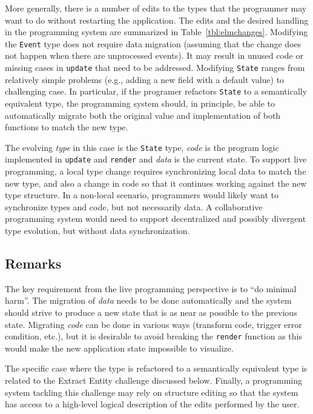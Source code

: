 \documentclass[english,submission]{programming}
\DeclareRobustCommand{\frameworkbox}[2][gray!15]{
\begin{tcolorbox}[breakable,left=3pt,right=3pt,top=3pt,bottom=3pt,colback=#1,colframe=#1,parbox=false,
  width=\dimexpr\textwidth\relax,enlarge left by=0mm,boxsep=5pt,arc=0pt,enlarge top by=0.5em,%
  outer arc=0pt]\setlength{\parskip}{0.5em}\setlength{\parindent}{0em}{\firamedium Framework perspective.}\quad #2
\end{tcolorbox}}
\begin{document}
More generally, there is a number of edits to the types that the programmer may want to do
without restarting the application. The edits and the desired handling in the programming
system are summarized in Table~\ref{tbl:elmchanges}. Modifying the \texttt{Event} type does not
require data migration (assuming that the change does not happen when there are unprocessed
events). It may result in unused code or missing cases in \texttt{update} that need to be addressed.
Modifying \texttt{State} ranges from relatively simple problems (e.g., adding a new field with a
default value) to challenging case. In particular, if the programer refactors \texttt{State} to a
semantically equivalent type, the programming system should, in principle, be able to automatically
migrate both the original value and implementation of both functions to match the new type.

\frameworkbox{
The evolving \emph{type} in this case is the \texttt{State} type, \emph{code} is the
program logic implemented in \texttt{update} and \texttt{render} and \emph{data} is the current
state. To support live programming, a local type change requires synchronizing local data to
match the new type, and also a change in code so that it continues working against the new type
structure. In a non-local scenario, programmers would likely want to synchronize types and code,
but not necessarily data. A collaborative programming system would need to support decentralized
and possibly divergent type evolution, but without data synchronization.
}

\subsection{Remarks}
The key requirement from the live programming perspective is to ``do minimal harm''.
The migration of \emph{data} needs to be done automatically and the system should strive
to produce a new state that is as near as possible to the previous state. Migrating
\emph{code} can be done in various ways (transform code, trigger error condition, etc.),
but it is desirable to avoid breaking the \texttt{render} function as this would make the
new application state impossible to visualize.

The specific case where the type is refactored to a semantically equivalent type is related to
the Extract Entity challenge discussed below. Finally, a programming system tackling this
challenge may rely on structure editing so that the system has access to a high-level logical
description of the edits performed by the user.
\end{document}
